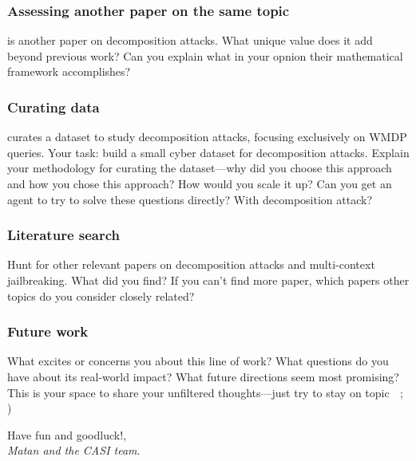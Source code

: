 \documentclass[11pt]{article}
\begin{document}
\subsubsection{Assessing another paper on the same topic}
\cite{glukhov2024breach} is another paper on decomposition attacks.
What unique value does it add beyond previous work?
Can you explain what in your opnion their mathematical framework accomplishes?

\subsubsection{Curating data}
\cite{brown2025benchmarking} curates a dataset to study decomposition attacks, focusing exclusively on WMDP queries.
Your task: build a small cyber dataset for decomposition attacks.
Explain your methodology for curating the dataset---why did you choose this approach and how you chose this approach?
How would you scale it up?
Can you get an agent to try to solve these questions directly? With decomposition attack? 

\subsubsection{Literature search}
Hunt for other relevant papers on decomposition attacks and multi-context jailbreaking.
What did you find?
If you can't find more paper, which papers other topics do you consider closely related?


\subsubsection{Future work}
What excites or concerns you about this line of work?
What questions do you have about its real-world impact?
What future directions seem most promising?
This is your space to share your unfiltered thoughts---just try to stay on topic $\;$ ; )





\begin{center}
Have fun and goodluck!, \\
\emph{Matan and the CASI team}.
\end{center}

\printbibliography
\end{document}
